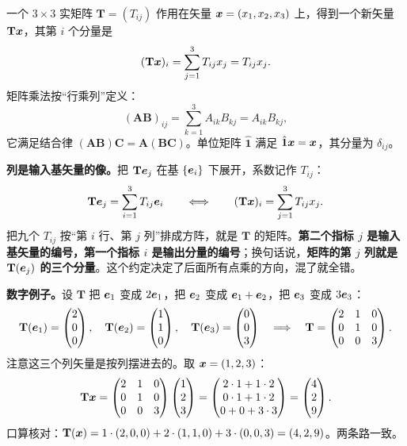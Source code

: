 \documentclass[11pt]{ctexart}
\newcommand{\ten}[1]{\mathbf{#1}}
\newcommand{\unitd}{\hat{\ten{1}}}
\let\origsubhdr\subhdr
\renewcommand{\subhdr}[1]{\par\needspace{3\baselineskip}\origsubhdr{#1}}
\begin{document}
\label{subsec:matrix}

一个 $3\times3$ 实矩阵 $\ten T=(T_{ij})$ 作用在矢量 $\boldsymbol{x}=(x_1,x_2,x_3)$ 上，得到一个新矢量 $\ten T\vect x$，其第 $i$ 个分量是
\[
(\ten T\vect x)_i=\sum_{j=1}^{3}T_{ij}x_j=T_{ij}x_j .
\]
矩阵乘法按“行乘列”定义：
\[
(\ten A\ten B)_{ij}=\sum_{k=1}^{3}A_{ik}B_{kj}=A_{ik}B_{kj},
\]
它满足结合律 $(\ten A\ten B)\ten C=\ten A(\ten B\ten C)$。单位矩阵 $\unitd$ 满足 $\unitd\vect x=\vect x$，其分量为 $\delta_{ij}$。

\textbf{列是输入基矢量的像。}把 $\ten T\vect e_j$ 在基 $\{\boldsymbol{e}_i\}$ 下展开，系数记作 $T_{ij}$：
\[
\ten T\vect e_j=\sum_{i=1}^{3}T_{ij}\vect e_i
\qquad\Longleftrightarrow\qquad
(\ten T\vect x)_i=\sum_{j=1}^{3}T_{ij}x_j .
\]
把九个 $T_{ij}$ 按“第 $i$ 行、第 $j$ 列”排成方阵，就是 $\ten T$ 的矩阵。\textbf{第二个指标 $j$ 是输入基矢量的编号，第一个指标 $i$ 是输出分量的编号}；换句话说，\textbf{矩阵的第 $j$ 列就是 $\ten T(\vect e_j)$ 的三个分量}。这个约定决定了后面所有点乘的方向，混了就全错。

\textbf{数字例子。}设 $\ten T$ 把 $\boldsymbol{e}_1$ 变成 $2\boldsymbol{e}_1$，把 $\boldsymbol{e}_2$ 变成 $\boldsymbol{e}_1+\boldsymbol{e}_2$，把 $\boldsymbol{e}_3$ 变成 $3\boldsymbol{e}_3$：
\[
\ten T(\vect e_1)=\begin{pmatrix}2\\0\\0\end{pmatrix},\quad
\ten T(\vect e_2)=\begin{pmatrix}1\\1\\0\end{pmatrix},\quad
\ten T(\vect e_3)=\begin{pmatrix}0\\0\\3\end{pmatrix}
\quad\Longrightarrow\quad
\ten T=\begin{pmatrix}2&1&0\\0&1&0\\0&0&3\end{pmatrix}.
\]
注意这三个列矢量是按列摆进去的。取 $\boldsymbol{x}=(1,2,3)$：
\[
\ten T\vect x=\begin{pmatrix}2&1&0\\0&1&0\\0&0&3\end{pmatrix}\begin{pmatrix}1\\2\\3\end{pmatrix}
=\begin{pmatrix}2\cdot1+1\cdot2\\0\cdot1+1\cdot2\\0+0+3\cdot3\end{pmatrix}=\begin{pmatrix}4\\2\\9\end{pmatrix}.
\]
口算核对：$\ten T(\vect x)=1\cdot(2,0,0)+2\cdot(1,1,0)+3\cdot(0,0,3)=(4,2,9)$。两条路一致。
\end{document}
